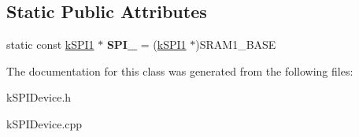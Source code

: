 \subsection*{Static Public Attributes}
\begin{DoxyCompactItemize}
\item 
static const \hyperlink{structkSPI1}{k\+S\+P\+I1} $\ast$ {\bfseries S\+P\+I\+\_} = (\hyperlink{structkSPI1}{k\+S\+P\+I1} $\ast$)S\+R\+A\+M1\+\_\+\+B\+A\+SE\hypertarget{classkSPI_a0aa7c24357362d2ba703068b4259cfd0}{}\label{classkSPI_a0aa7c24357362d2ba703068b4259cfd0}

\end{DoxyCompactItemize}


The documentation for this class was generated from the following files\+:\begin{DoxyCompactItemize}
\item 
k\+S\+P\+I\+Device.\+h\item 
k\+S\+P\+I\+Device.\+cpp\end{DoxyCompactItemize}
